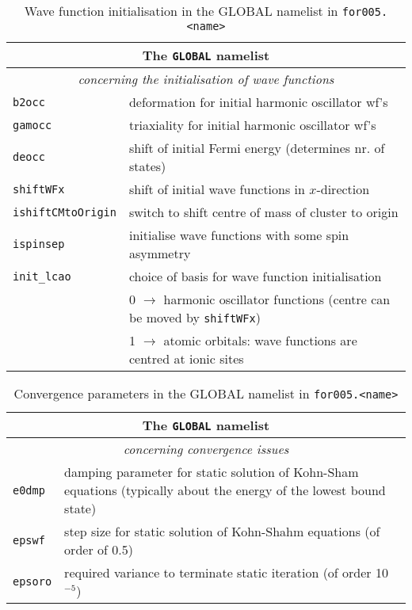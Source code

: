 \documentclass[11pt,a4paper]{article}
\begin{document}
		\begin{table}[h]
			\caption{Wave function initialisation in the GLOBAL namelist in \texttt{for005.<name>}}\label{tab:input-params-wfs}
			\begin{tabular}{|p{3.5cm}|p{11.2cm}|}
				\hline
				\multicolumn{2}{|c|}{The \texttt{GLOBAL} namelist}\\
				\hline
				\multicolumn{2}{|c|}{\textit{\color{activeColor}concerning the initialisation of wave functions}} \\
				\hline
				\texttt{b2occ}& deformation for initial harmonic oscillator wf's\\
				\hline
				\texttt{gamocc}& triaxiality for initial harmonic oscillator wf's\\
				\hline
				\texttt{deocc}& shift of initial Fermi energy (determines nr. of
				states)\\
				\hline
				\texttt{shiftWFx}& shift of initial wave functions in $x$-direction \\
				\hline
				\texttt{ishiftCMtoOrigin}& switch to shift centre of mass of cluster to origin\\
				\hline
				\texttt{ispinsep}& initialise wave functions with some spin asymmetry\\
				\hline
				\texttt{init\_lcao}& choice of basis for wave function initialisation \\
				& 0 $\rightarrow$ harmonic oscillator functions (centre can be
				moved by \texttt{shiftWFx}) \\
				& 1 $\rightarrow$ atomic orbitals: wave functions are centred at ionic sites\\
				\hline
			\end{tabular}
		\end{table}

		\begin{table}[h]
			\caption{Convergence parameters in the GLOBAL namelist in \texttt{for005.<name>}}\label{tab:input-params-conv}
			\begin{tabular}{|p{3.5cm}|p{11.2cm}|}
				\hline
				\multicolumn{2}{|c|}{The \texttt{GLOBAL} namelist}\\
				\hline
				\multicolumn{2}{|c|}{\textit{\color{activeColor}concerning convergence issues}}\\
				\hline
				\texttt{e0dmp}& damping parameter for static solution of Kohn-Sham equations (typically about the energy of the lowest bound state)\\
				\hline
				\texttt{epswf}& step size for static solution of Kohn-Shahm equations (of order of 0.5)\\
				\hline
				\texttt{epsoro}& required variance to terminate static iteration (of order 10$^{-5}$)\\
				\hline
			\end{tabular}
		\end{table}
		
\end{document}
